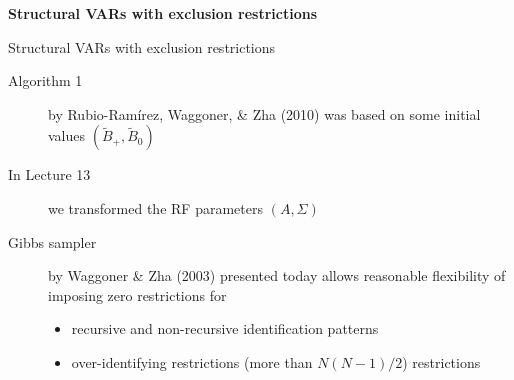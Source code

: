 \documentclass[notes,blackandwhite,mathsans,usenames,dvipsnames]{beamer}
\begin{document}
{
\begin{frame}

\begin{adjustwidth}{-0.5cm}{0cm}
\vspace{8.3cm}\Large
\textbf{{\color{mcxs1}Structural VARs with} {\color{mcxs4}exclusion restrictions}}
\end{adjustwidth}

\end{frame}
}




\begin{frame}{Structural VARs with exclusion restrictions}
\begin{description}
\item[Algorithm 1] {\color{mcxs2}by} Rubio-Ram\'irez, Waggoner, \& Zha (2010) {\color{mcxs2}was based on some initial values} $(\tilde{B}_+,\tilde{B}_0)$

\bigskip\item[In Lecture 13] {\color{mcxs2}we transformed the RF parameters} $(A,\Sigma)$

\bigskip\item[Gibbs sampler] {\color{mcxs2}by} Waggoner \& Zha (2003) {\color{mcxs2}presented today allows reasonable flexibility of imposing zero restrictions for}
	\begin{itemize}[label=\textbullet,leftmargin = *]
	\item {\color{mcxs2}recursive and non-recursive identification patterns}
	
	\smallskip\item {\color{mcxs2}over-identifying restrictions (more than} $N(N-1)/2${\color{mcxs2}) restrictions}
	\end{itemize}
\end{description}

\end{frame}
\end{document}

